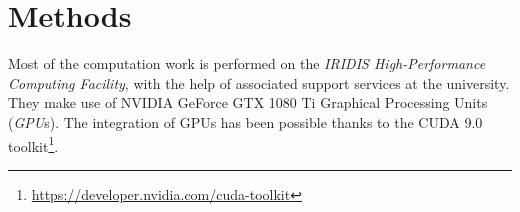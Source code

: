 \chapter{Methods} \label{Chapter: Methods}






Most of the computation work is performed on the \textit{IRIDIS High-Performance Computing Facility}, with the help of associated support services at the university. They make use of NVIDIA\textregistered$ $ GeForce GTX 1080 Ti Graphical Processing Units (\textit{GPU}s). The integration of GPUs has been possible thanks to the CUDA 9.0 toolkit\footnote{\url{https://developer.nvidia.com/cuda-toolkit}}.


